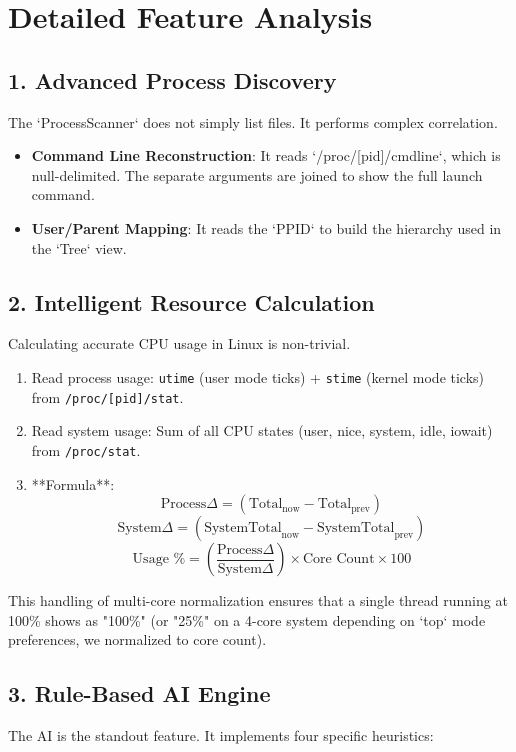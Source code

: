 \documentclass[a4paper,12pt]{article}
\begin{document}
\newpage

\section{Detailed Feature Analysis}

\subsection{1. Advanced Process Discovery}
The `ProcessScanner` does not simply list files. It performs complex correlation.
\begin{itemize}
    \item \textbf{Command Line Reconstruction}: It reads `/proc/[pid]/cmdline`, which is null-delimited. The separate arguments are joined to show the full launch command.
    \item \textbf{User/Parent Mapping}: It reads the `PPID` to build the hierarchy used in the `Tree` view.
\end{itemize}

\subsection{2. Intelligent Resource Calculation}
Calculating accurate CPU usage in Linux is non-trivial.
\begin{enumerate}
    \item Read process usage: \texttt{utime} (user mode ticks) + \texttt{stime} (kernel mode ticks) from \texttt{/proc/[pid]/stat}.
    \item Read system usage: Sum of all CPU states (user, nice, system, idle, iowait) from \texttt{/proc/stat}.
    \item **Formula**:
    $$ \text{Process} \Delta = (\text{Total}_{\text{now}} - \text{Total}_{\text{prev}}) $$
    $$ \text{System} \Delta = (\text{SystemTotal}_{\text{now}} - \text{SystemTotal}_{\text{prev}}) $$
    $$ \text{Usage \%} = \left( \frac{\text{Process} \Delta}{\text{System} \Delta} \right) \times \text{Core Count} \times 100 $$
\end{enumerate}
This handling of multi-core normalization ensures that a single thread running at 100\% shows as "100\%" (or "25\%" on a 4-core system depending on `top` mode preferences, we normalized to core count).

\subsection{3. Rule-Based AI Engine}
The AI is the standout feature. It implements four specific heuristics:
\end{document}
